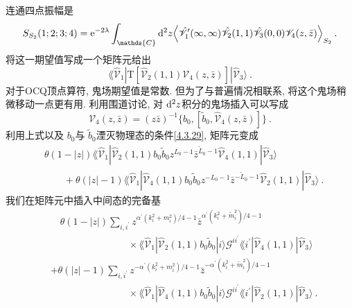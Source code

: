 连通四点振幅是
\begin{equation}
	S_{S_{2}}(1; 2; 3; 4) = \me^{-2 \lambda} \int_{\mathds{C}} \dif^{2} z 
	\Bigl\langle \hat{\mathscr{V}}_{1}^{\prime}(\infty, \infty) \hat{\mathscr{V}}_{2}(1,1) \hat{\mathscr{V}}_{3}(0,0) 
	                  \mathscr{V}_{4}(z, \bar{z})\Bigr\rangle_{S_{2}} \:. \label{9.1.16}
\end{equation}
将这一期望值写成一个矩阵元给出
\begin{equation}
	\lAngle\hat{\mathscr{V}}_{1}|\mathrm{T}[\hat{\mathscr{V}}_{2}(1,1) \mathscr{V}_{4}(z, \bar{z})]| 
	\hat{\mathscr{V}}_{3}\rangle \:. \label{9.1.17}
\end{equation}
对于OCQ顶点算符, 鬼场期望值是常数. 但为了与普遍情况相联系, 将这个鬼场稍微移动一点更有用. 利用围道讨论, 对 $\mathrm{d}^{2} z$积分的鬼场插入可以写成
\begin{equation}
	\mathscr{V}_{4}(z, \bar{z})=(z \bar{z})^{-1}\bigl \{b_{0}, [\tilde{b}_{0}, \hat{\mathscr{V}}_{4}(z, \bar{z})]\bigr\} \:. \label{9.1.18}
\end{equation}
利用上式以及  $b_{0}$与 $\tilde{b}_{0}$湮灭物理态的条件\eqref{4.3.29}, 矩阵元变成
\begin{align}
&\theta(1-|z|) \lAngle \hat{\mathscr{V}}_{1} |\hat{\mathscr{V}}_{2}(1,1) b_{0} \tilde{b}_{0} z^{L_{0}-1} \bar{z}^{\tilde{L}_{0}-1} 
                       \hat{\mathscr{V}}_{4}(1,1)| \hat{\mathscr{V}}_{3}\rangle  \nonumber \\
&\qquad + \theta(|z|-1) \lAngle\hat{\mathscr{V}}_{1}|\hat{\mathscr{V}}_{4}(1,1) b_{0} \tilde{b}_{0} z^{-L_{0}-1} 
                        \bar{z}^{-\tilde{L}_{0}-1} \hat{\mathscr{V}}_{2}(1,1)|\hat{\mathscr{V}}_{3}\rangle \:. \label{9.1.19}
\end{align}
我们在矩阵元中插入中间态的完备基
\begin{align}
	&\quad \theta(1-|z|) \sum_{i, i^{\prime}} z^{\alpha^{\prime}(k_{i}^{2}+m_{i}^{2})/4 - 1} 
	                                          \bar{z}^{\alpha^{\prime}(k_{i}^{2}+\tilde{m}_{i}^{2})/4 - 1} \nonumber  \\[-12pt] 
	& \qquad \qquad \qquad \qquad \times \lAngle \hat{\mathscr{V}}_{1}|\hat{\mathscr{V}}_{2}(1,1) b_{0} \tilde{b}_{0}|i\rangle 
	  \mathscr{G}^{i i^{\prime}} \lAngle i^{\prime} |\hat{\mathscr{V}}_{4}(1,1)| \hat{\mathscr{V}}_{3}\rangle  \nonumber \\[5pt]
	&+ \theta(|z|-1) \sum_{i, i^{\prime}} z^{-\alpha^{\prime}(k_{i}^{2}+m_{i}^{2})/4 - 1} 
	                   \bar{z}^{-\alpha^{\prime}(k_{i}^{2}+\tilde{m}_{i}^{2})/4 - 1} \nonumber \\[-12pt] 
	& \qquad \qquad \qquad \qquad \times \lAngle \hat{\mathscr{V}}_{1} |\hat{\mathscr{V}}_{4}(1,1) b_{0} \tilde{b}_{0}|i\rangle 
	   \mathscr{G}^{i i^{\prime}} \lAngle i^{\prime}|\hat{\mathscr{V}}_{2}(1,1)|\hat{\mathscr{V}}_{3}\rangle \:. \label{9.1.20}
\end{align}

